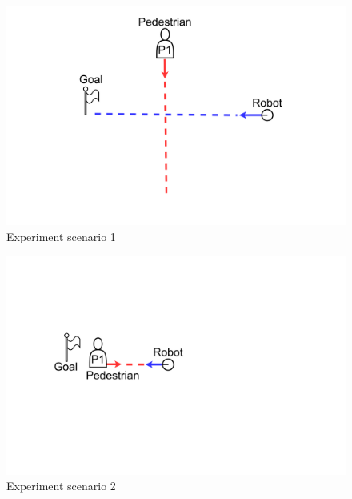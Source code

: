 \begin{figure}[H]
  \centering
  \includegraphics[keepaspectratio, scale=0.15]{images/scenario1.pdf}
  \caption{Experiment scenario 1}
  \label{Fig:scenario1}
\end{figure}

\vspace{-20pt}

\begin{figure}[H]
  \centering
  \includegraphics[keepaspectratio, scale=0.15]{images/scenario2.pdf}
  \caption{Experiment scenario 2}
  \label{Fig:scenario2}
\end{figure}

